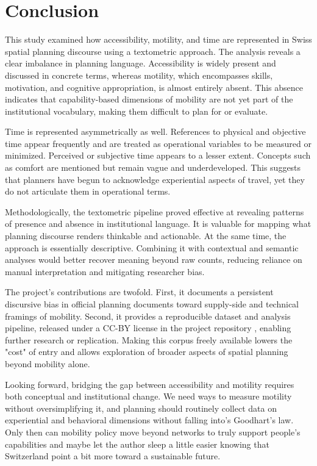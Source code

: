 \section{Conclusion}

This study examined how accessibility, motility, and time are represented in Swiss spatial planning discourse using a textometric approach. The analysis reveals a clear imbalance in planning language. Accessibility is widely present and discussed in concrete terms, whereas motility, which encompasses skills, motivation, and cognitive appropriation, is almost entirely absent. This absence indicates that capability-based dimensions of mobility are not yet part of the institutional vocabulary, making them difficult to plan for or evaluate.

Time is represented asymmetrically as well. References to physical and objective time appear frequently and are treated as operational variables to be measured or minimized. Perceived or subjective time appears to a lesser extent. Concepts such as comfort are mentioned but remain vague and underdeveloped. This suggests that planners have begun to acknowledge experiential aspects of travel, yet they do not articulate them in operational terms.

Methodologically, the textometric pipeline proved effective at revealing patterns of presence and absence in institutional language. It is valuable for mapping what planning discourse renders thinkable and actionable. At the same time, the approach is essentially descriptive. Combining it with contextual and semantic analyses would better recover meaning beyond raw counts, reducing reliance on manual interpretation and mitigating researcher bias.

The project’s contributions are twofold. First, it documents a persistent discursive bias in official planning documents toward supply-side and technical framings of mobility. Second, it provides a reproducible dataset and analysis pipeline, released under a CC-BY license in the project repository \cite{morand_nathmoswissspatialplanningtextometricanalysis_2025}, enabling further research or replication. Making this corpus freely available lowers the "cost" of entry and allows exploration of broader aspects of spatial planning beyond mobility alone.

Looking forward, bridging the gap between accessibility and motility requires both conceptual and institutional change. We need ways to measure motility without oversimplifying it, and planning should routinely collect data on experiential and behavioral dimensions without falling into's Goodhart's law. Only then can mobility policy move beyond networks to truly support people’s capabilities and maybe let the author sleep a little easier knowing that Switzerland point a bit more toward a sustainable future.
